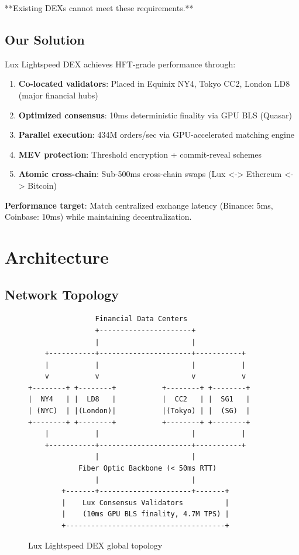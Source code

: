 \documentclass[11pt,letterpaper]{article}
\begin{document}
**Existing DEXs cannot meet these requirements.**

\subsection{Our Solution}

Lux Lightspeed DEX achieves HFT-grade performance through:

\begin{enumerate}
    \item \textbf{Co-located validators}: Placed in Equinix NY4, Tokyo CC2, London LD8 (major financial hubs)
    \item \textbf{Optimized consensus}: 10ms deterministic finality via GPU BLS (Quasar)
    \item \textbf{Parallel execution}: 434M orders/sec via GPU-accelerated matching engine
    \item \textbf{MEV protection}: Threshold encryption + commit-reveal schemes
    \item \textbf{Atomic cross-chain}: Sub-500ms cross-chain swaps (Lux <-> Ethereum <-> Bitcoin)
\end{enumerate}

\textbf{Performance target}: Match centralized exchange latency (Binance: 5ms, Coinbase: 10ms) while maintaining decentralization.

\section{Architecture}

\subsection{Network Topology}

\begin{figure}[h]
\centering
\begin{verbatim}
                Financial Data Centers
                +----------------------+
                |                      |
    +-----------+----------------------+-----------+
    |           |                      |           |
    v           v                      v           v
+--------+ +--------+           +--------+ +--------+
|  NY4   | |  LD8   |           |  CC2   | |  SG1   |
| (NYC)  | |(London)|           |(Tokyo) | |  (SG)  |
+--------+ +--------+           +--------+ +--------+
    |           |                      |           |
    +-----------+----------------------+-----------+
                |                      |
            Fiber Optic Backbone (< 50ms RTT)
                |                      |
        +-------+----------------------+-------+
        |    Lux Consensus Validators          |
        |    (10ms GPU BLS finality, 4.7M TPS) |
        +--------------------------------------+
\end{verbatim}
\caption{Lux Lightspeed DEX global topology}
\end{figure}
\end{document}
